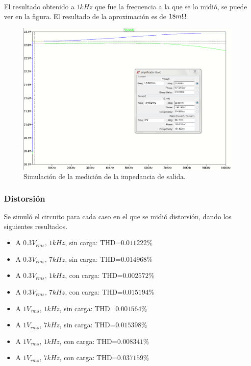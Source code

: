 El resultado obtenido a $1kHz$ que fue la frecuencia a la que se lo midió, se puede ver en la figura. El resultado de la aproximación es de $18m\ohm$.

\begin{figure}[H]
\centering
\includegraphics[width=1\textwidth]{img/Rout_2.png}
\caption{Simulación de la medición de la impedancia de salida.}
\label{Rout_med}
\end{figure}

\subsubsection{Distorsión}

Se simuló el circuito para cada caso en el que se midió distorsión, dando los siguientes resultados.

\begin{itemize}
\item A $0.3V_{rms}$, $1kHz$, sin carga: THD=$0.011222\%$
\item A $0.3V_{rms}$, $7kHz$, sin carga: THD=$0.014968\%$
\item A $0.3V_{rms}$, $1kHz$, con carga: THD=$0.002572\%$
\item A $0.3V_{rms}$, $7kHz$, con carga: THD=$0.015194\%$
\item A $1V_{rms}$, $1kHz$, sin carga: THD=$0.001564\%$
\item A $1V_{rms}$, $7kHz$, sin carga: THD=$0.015398\%$
\item A $1V_{rms}$, $1kHz$, con carga: THD=$0.008341\%$
\item A $1V_{rms}$, $7kHz$, con carga: THD=$0.037159\%$
\end{itemize}